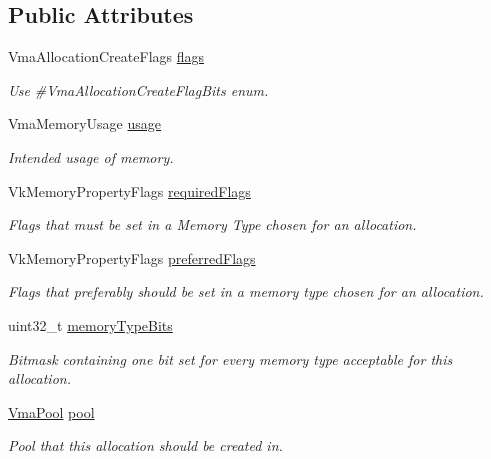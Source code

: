 \subsection*{Public Attributes}
\begin{DoxyCompactItemize}
\item 
\mbox{\label{structVmaAllocationCreateInfo_add09658ac14fe290ace25470ddd6d41b}} 
Vma\+Allocation\+Create\+Flags \hyperlink{structVmaAllocationCreateInfo_add09658ac14fe290ace25470ddd6d41b}{flags}
\begin{DoxyCompactList}\small\item\em Use \#\+Vma\+Allocation\+Create\+Flag\+Bits enum. \end{DoxyCompactList}\item 
Vma\+Memory\+Usage \hyperlink{structVmaAllocationCreateInfo_accb8b06b1f677d858cb9af20705fa910}{usage}
\begin{DoxyCompactList}\small\item\em Intended usage of memory. \end{DoxyCompactList}\item 
Vk\+Memory\+Property\+Flags \hyperlink{structVmaAllocationCreateInfo_a9166390303ff42d783305bc31c2b6b90}{required\+Flags}
\begin{DoxyCompactList}\small\item\em Flags that must be set in a Memory Type chosen for an allocation. \end{DoxyCompactList}\item 
Vk\+Memory\+Property\+Flags \hyperlink{structVmaAllocationCreateInfo_a7fe8d81a1ad10b2a2faacacee5b15d6d}{preferred\+Flags}
\begin{DoxyCompactList}\small\item\em Flags that preferably should be set in a memory type chosen for an allocation. \end{DoxyCompactList}\item 
uint32\+\_\+t \hyperlink{structVmaAllocationCreateInfo_a3bf940c0271d85d6ba32a4d820075055}{memory\+Type\+Bits}
\begin{DoxyCompactList}\small\item\em Bitmask containing one bit set for every memory type acceptable for this allocation. \end{DoxyCompactList}\item 
\hyperlink{structVmaPool}{Vma\+Pool} \hyperlink{structVmaAllocationCreateInfo_a6272c0555cfd1fe28bff1afeb6190150}{pool}
\begin{DoxyCompactList}\small\item\em Pool that this allocation should be created in. \end{DoxyCompactList}\item 

\end{DoxyCompactItemize}
